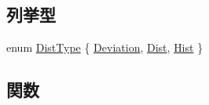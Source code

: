 \subsection*{列挙型}
\begin{DoxyCompactItemize}
\item 
enum \hyperlink{namespaceStats_a1d00be67865ecfaa5774f566d76a6876}{DistType} \{ \hyperlink{namespaceStats_a1d00be67865ecfaa5774f566d76a6876a9c7a78ae450635ef56b14d9ac5714672}{Deviation}, 
\hyperlink{namespaceStats_a1d00be67865ecfaa5774f566d76a6876adafb9a616d02d2905c1e83984012b298}{Dist}, 
\hyperlink{namespaceStats_a1d00be67865ecfaa5774f566d76a6876af89f9b7b8883a8af366c466ae76274f4}{Hist}
 \}
\end{DoxyCompactItemize}
\subsection*{関数}
